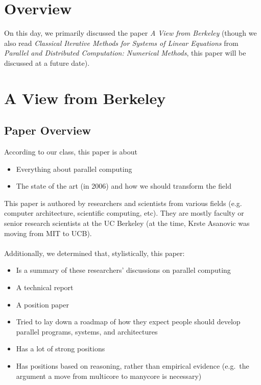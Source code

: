 



\section{Overview}\label{feb-11:overview}
On this day, we primarily discussed the paper \textit{A View from Berkeley}\cite{Asanovic:EECS-2006-183} (though we also read \textit{Classical Iterative Methods for Systems of Linear Equations} from \textit{Parallel and Distributed Computation: Numerical Methods}\cite{Bertsekas:1989:PDC:59912}, this paper will be discussed at a future date).

\section{A View from Berkeley}\label{feb-11:a-view}
\subsection{Paper Overview}\label{feb-11:a-view:overview}
According to our class, this paper is about
\begin{itemize}
    \item Everything about parallel computing
    \item The state of the art (in 2006) and how we should transform the field
\end{itemize}
This paper is authored by researchers and scientists from various fields (e.g. computer architecture, scientific computing, etc).
They are mostly faculty or senior research scientists at the UC Berkeley (at the time, Krste Asanovic was moving from MIT to UCB).
\\ \\
Additionally, we determined that, stylistically, this paper:
\begin{itemize}
    \item Is a summary of these researchers' discussions on parallel computing
    \item A technical report
    \item A position paper
    \item Tried to lay down a roadmap of how they expect people should develop parallel programs, systems, and architectures
    \item Has a lot of strong positions
    \item Has positions based on reasoning, rather than empirical evidence (e.g.\ the argument a move from multicore to manycore is necessary)
\end{itemize}

